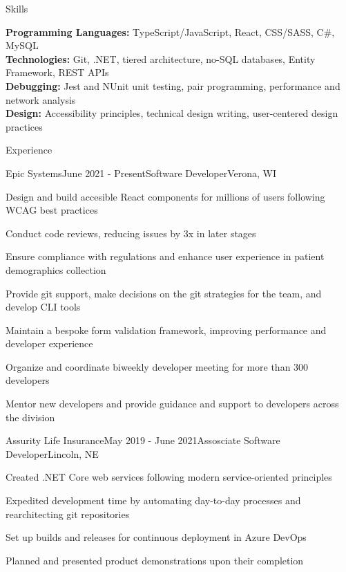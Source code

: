 \documentclass[
	11pt, %
]{article} %
\begin{document}
\printname

\begin{rSection}{Skills}

	\textbf{Programming Languages:} TypeScript/JavaScript, React, CSS/SASS, C\#, MySQL \\
	\textbf{Technologies:} Git, .NET, tiered architecture, no-SQL databases, Entity Framework, REST APIs \\
	\textbf{Debugging:} Jest and NUnit unit testing, pair programming, performance and network analysis \\
	\textbf{Design:} Accessibility principles, technical design writing, user-centered design practices

\end{rSection}

\begin{rSection}{Experience}

	\begin{rSubsection}{Epic Systems}{June 2021 - Present}{Software Developer}{Verona, WI}
		\item Design and build accesible React components for millions of users following WCAG best practices
		\item Conduct code reviews, reducing issues by 3x in later stages
		\item Ensure compliance with regulations and enhance user experience in patient demographics collection
		\item Provide git support, make decisions on the git strategies for the team, and develop CLI tools
		\item Maintain a bespoke form validation framework, improving performance and developer experience
		\item Organize and coordinate biweekly developer meeting for more than 300 developers
		\item Mentor new developers and provide guidance and support to developers across the division
	\end{rSubsection}

	\begin{rSubsection}{Assurity Life Insurance}{May 2019 - June 2021}{Assosciate Software Developer}{Lincoln, NE}
		\item Created .NET Core web services following modern service-oriented principles
		\item Expedited development time by automating day-to-day processes and rearchitecting git repositories
		\item Set up builds and releases for continuous deployment in Azure DevOps
		\item Planned and presented product demonstrations upon their completion
	\end{rSubsection}

\end{rSection}
\end{document}
